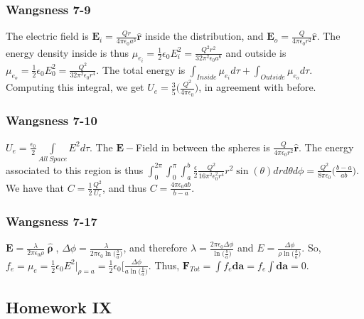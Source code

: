             \subsubsection{Wangsness 7-9}
                The electric field is $\mathbf{E}_i = \frac{Qr}{4\pi \epsilon_0 a^3}\hat{\mathbf{r}}$
                inside the distribution, and $\mathbf{E}_o = \frac{Q}{4\pi\epsilon_0r^2}\hat{\mathbf{r}}$.
                The energy density inside is thus
                $\mu_{e_i} = \frac{1}{2}\epsilon_0 E_i^2=\frac{Q^2r^2}{32\pi^2 \epsilon_0 a^6}$
                and outside is $\mu_{e_o} = \frac{1}{2}\epsilon_0 E_0^2 = \frac{Q^2}{32\pi^2 \epsilon_0 r^4}$.
                The total energy is $\int_{Inside} \mu_{e_i}d\tau + \int_{Outside} \mu_{e_o}d\tau$.
                Computing this integral, we get $U_e = \frac{3}{5}\bigg( \frac{Q^2}{4\pi \epsilon_0}\bigg)$,
                in agreement with before.
            \subsubsection{Wangsness 7-10}
                $U_e = \frac{\epsilon_0}{2} \underset{All\ Space}\int E^2 d\tau$.
                The $\mathbf{E}-$Field in between the spheres is
                $\frac{Q}{4\pi \epsilon_0 r^2}\hat{\mathbf{r}}$.
                The energy associated to this region is thus
                $\int_{0}^{2\pi}\int_{0}^{\pi}\int_{a}^{b} \frac{\epsilon}{2} \frac{Q^2}{16\pi^2 \epsilon_0^2 r^4}r^2\sin(\theta) dr d\theta d\phi = \frac{Q^2}{8\pi \epsilon_0}\bigg(\frac{b-a}{ab}\bigg)$.
                We have that $C = \frac{1}{2} \frac{Q^2}{U_e}$, and thus $C=\frac{4\pi \epsilon_0 ab}{b-a}$.
            \subsubsection{Wangsness 7-17}
                $\mathbf{E} = \frac{\lambda}{2\pi\epsilon_0\rho}\hat{\boldsymbol{\uprho}}$,
                $\Delta\phi = \frac{\lambda}{2\pi \epsilon_0 \ln\big(\frac{b}{a}\big)}$,
                and therefore $\lambda=\frac{2\pi \epsilon_0 \Delta\phi}{\ln\big(\frac{b}{a}\big)}$
                and $E = \frac{\Delta \phi}{\rho \ln\big(\frac{b}{a}\big)}$.
                So, $f_e = \mu_e = \frac{1}{2} \epsilon_0 E^2\bigg|_{\rho = a} = \frac{1}{2} \epsilon_0 \bigg[ \frac{\Delta\phi}{a \ln\big(\frac{b}{a}\big)}$.
                Thus, $\mathbf{F}_{Tot} = \int f_e \mathbf{da} = f_e \int \mathbf{da} = 0$.
        \subsection{Homework IX}

